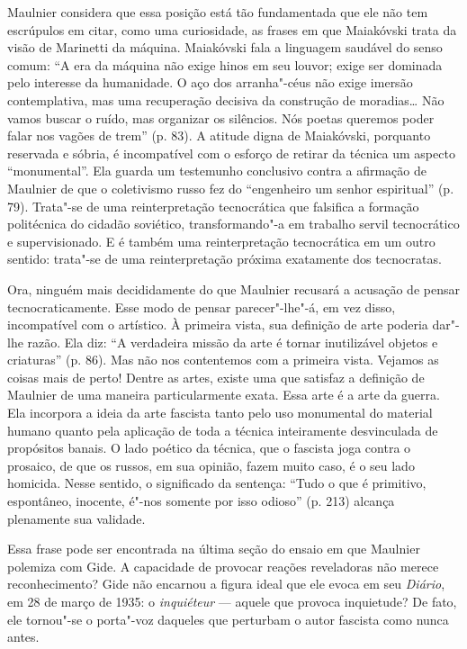 Maulnier considera que essa posição está tão fundamentada que ele não
tem escrúpulos em citar, como uma curiosidade, as frases em que
Maiakóvski trata da visão de Marinetti da máquina. Maiakóvski fala
a linguagem saudável do senso comum: ``A era da máquina não exige hinos
em seu louvor; exige ser dominada pelo interesse da humanidade. O aço
dos arranha"-céus não exige imersão contemplativa, mas uma recuperação
decisiva da construção de moradias\ldots{} Não vamos buscar o ruído, mas
organizar os silêncios. Nós poetas queremos poder falar nos vagões de
trem'' (p. 83). A atitude digna de Maiakóvski, porquanto reservada e
sóbria, é incompatível com o esforço de retirar da técnica um aspecto
``monumental''. Ela guarda um testemunho conclusivo contra a afirmação
de Maulnier de que o coletivismo russo fez do ``engenheiro um senhor
espiritual'' (p. 79). Trata"-se de uma reinterpretação tecnocrática que
falsifica a formação politécnica do cidadão soviético,
transformando"-a em trabalho servil tecnocrático e supervisionado.
E é também uma reinterpretação tecnocrática em um outro sentido: trata"-se de
uma reinterpretação próxima exatamente dos tecnocratas.

Ora, ninguém mais decididamente do que Maulnier recusará a acusação de
pensar tecnocraticamente. Esse modo de pensar parecer"-lhe"-á, em vez
disso, incompatível com o artístico. À primeira vista, sua definição de
arte poderia dar"-lhe razão. Ela diz: ``A verdadeira missão da arte é
tornar inutilizável objetos e criaturas'' (p. 86). Mas não nos
contentemos com a primeira vista. Vejamos as coisas mais de perto!
Dentre as artes, existe uma que satisfaz a definição de Maulnier de uma
maneira particularmente exata. Essa arte é a arte da guerra. Ela
incorpora a ideia da arte fascista tanto pelo uso monumental do material
humano quanto pela aplicação de toda a técnica inteiramente desvinculada
de propósitos banais. O lado poético da técnica, que o fascista joga
contra o prosaico, de que os russos, em sua opinião, fazem muito caso, é
o seu lado homicida. Nesse sentido, o significado da sentença: ``Tudo o
que é primitivo, espontâneo, inocente, é"-nos somente por isso odioso''
(p. 213) alcança plenamente sua validade.

Essa frase pode ser encontrada na última seção do ensaio em que Maulnier
polemiza com Gide. A capacidade de provocar reações reveladoras não
merece reconhecimento? Gide não encarnou a figura ideal que ele evoca em
seu \emph{Diário}, em 28 de março de 1935: o \emph{inquiéteur} --- aquele
que provoca inquietude? De fato, ele tornou"-se o porta"-voz daqueles que
perturbam o autor fascista como nunca antes.

